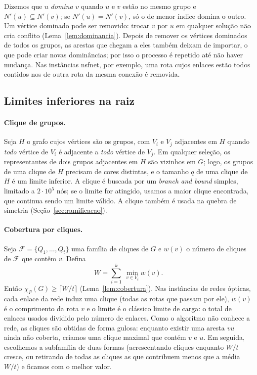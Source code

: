 \documentclass[12pt]{article}
\newcommand{\chiP}{\chi_P}
\begin{document}
Dizemos que $u$ \emph{domina} $v$ quando $u$ e $v$ estão no mesmo grupo e
$N'(u)\subseteq N'(v)$; se $N'(u)=N'(v)$, só o de menor índice domina o outro.
Um vértice dominado pode ser removido: trocar $v$ por $u$ em qualquer solução
não cria conflito (Lema~\ref{lem:dominancia}). Depois de remover os vértices
dominados de todos os grupos, as arestas que chegam a eles também deixam de
importar, o que pode criar novas dominâncias; por isso o processo é repetido
até não haver mudança. Nas instâncias nsfnet, por exemplo, uma rota cujos
enlaces estão todos contidos nos de outra rota da mesma conexão é removida.

\subsection{Limites inferiores na raiz}

\paragraph{Clique de grupos.} Seja $H$ o grafo cujos vértices são os grupos,
com $V_i$ e $V_j$ adjacentes em $H$ quando \emph{todo} vértice de $V_i$ é
adjacente a \emph{todo} vértice de $V_j$. Em qualquer seleção, os
representantes de dois grupos adjacentes em $H$ são vizinhos em $G$; logo, os
grupos de uma clique de $H$ precisam de cores distintas, e o tamanho $q$ de
uma clique de $H$ é um limite inferior. A clique é buscada por um
\emph{branch and bound} simples, limitado a $2\cdot 10^5$ nós; se o limite for
atingido, usamos a maior clique encontrada, que continua sendo um limite
válido. A clique também é usada na quebra de simetria
(Seção~\ref{sec:ramificacao}).

\paragraph{Cobertura por cliques.} Seja $\mathcal{F}=\{Q_1,\dots,Q_t\}$ uma
família de cliques de $G$ e $w(v)$ o número de cliques de $\mathcal{F}$ que
contêm $v$. Defina
\[
  W=\sum_{i=1}^{k}\ \min_{v\in V_i} w(v).
\]
Então $\chiP(G)\ge\lceil W/t\rceil$ (Lema~\ref{lem:cobertura}). Nas
instâncias de redes ópticas, cada enlace da rede induz uma clique (todas as
rotas que passam por ele), $w(v)$ é o comprimento da rota $v$ e o limite é o
clássico limite de carga: o total de enlaces usados dividido pelo número de
enlaces. Como o algoritmo não conhece a rede, as cliques são obtidas de forma
gulosa: enquanto existir uma aresta $vu$ ainda não coberta, criamos uma clique
maximal que contém $v$ e $u$. Em seguida, escolhemos a subfamília de duas
formas (acrescentando cliques enquanto $W/t$ cresce, ou retirando de todas as
cliques as que contribuem menos que a média $W/t$) e ficamos com o melhor
valor.
\end{document}
